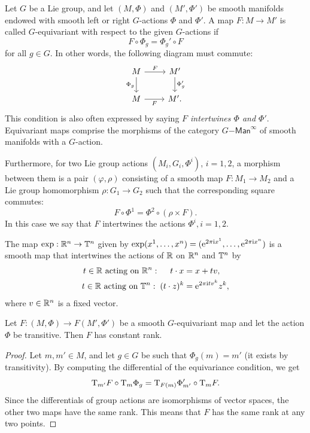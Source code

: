 \begin{defn}
    Let $G$ be a Lie group, and let $(M,\Phi)$ and $(M',\Phi')$ be smooth manifolds endowed with smooth left or right $G$-actions $\Phi$ and $\Phi'$. A map $F:M\to M'$ is called $G$-equivariant with respect to the given $G$-actions if
    \[F\circ \Phi_g=\Phi_g' \circ F\]
    for all $g\in G$.
    In other words, the following diagram must commute:
    \[
    \begin{tikzcd}[every matrix/.append style={name=m}]
       M \arrow[r,"F"]\arrow[d,"\Phi_g",swap] & M'\arrow[d,"\Phi_g'"]\\
       M \arrow[r,"F", swap] & M'.
    \end{tikzcd}
    \]
    This condition is also often expressed by saying \emph{$F$ intertwines $\Phi$ and $\Phi'$}. Equivariant maps comprise the morphisms of the category $G\mathsf{-Man}^\infty$ of smooth manifolds with a $G$-action.

    Furthermore, for two Lie group actions $(M_i,G_i,\Phi^i)$, $i=1,2$, a morphism between them is a pair $(\varphi,\rho)$ consisting of a smooth map $F:M_1\to M_2$ and a Lie group homomorphism $\rho:G_1\to G_2$ such that the corresponding square commutes:
    \[F\circ \Phi^1=\Phi^2\circ \left(\rho\times F \right).\]
    In this case we say that $F$ intertwines the actions $\Phi^i,i=1,2$.
\end{defn}

\begin{example}
    The map $\exp:\mathbb{R}^n\to \mathbb{T}^n$ given by $\exp(x^1,\ldots,x^n)=(\mathrm{e}^{2\pi\mathrm{i} x^1},\ldots,\mathrm{e}^{2\pi\mathrm{i} x^n})$ is a smooth map that intertwines the actions of $\mathbb{R}$ on $\mathbb{R}^n$ and $\mathbb{T}^n$ by
    \begin{align}
        t\in\mathbb{R}\text{ acting on }\mathbb{R}^n:\;\quad t\cdot x&=x+tv,\\
        t\in\mathbb{R}\text{ acting on }\mathbb{T}^n:\; (t\cdot z)^k&=\mathrm{e}^{2\pi\mathrm{i} tv^k}z^k,
    \end{align}
    where $v\in\mathbb{R}^n$ is a fixed vector.
\end{example}

\begin{thm}\label{thm equivariant rank}
    Let $F:(M,\Phi)\to F(M',\Phi')$ be a smooth $G$-equivariant map and let the action $\Phi$ be transitive. Then $F$ has constant rank.
\end{thm}
\begin{proof}
    Let $m,m'\in M$, and let $g\in G$ be such that $\Phi_g(m)=m'$ (it exists by transitivity). By computing the differential of the equivariance condition, we get
    \[\mathrm{T}_{m'}F\circ \mathrm{T}_m\Phi_g=\mathrm{T}_{F(m)}\Phi_{m'}'\circ \mathrm{T}_mF.\]
    Since the differentials of group actions are isomorphisms of vector spaces, the other two maps have the same rank. This means that $F$ has the same rank at any two points.
\end{proof}


